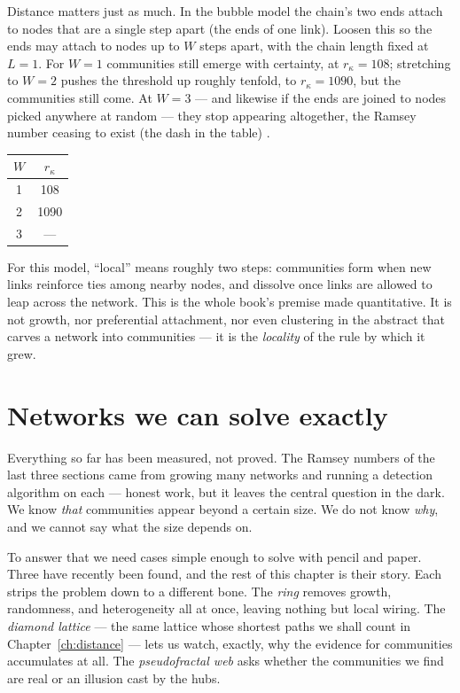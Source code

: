 Distance matters just as much. In the bubble model the chain's two ends attach to
nodes that are a single step apart (the ends of one link). Loosen this so the
ends may attach to nodes up to $W$ steps apart, with the chain length fixed at
$L=1$. For $W=1$ communities still emerge with certainty, at $r_\kappa=108$;
stretching to $W=2$ pushes the threshold up roughly tenfold, to $r_\kappa=1090$,
but the communities still come. At $W=3$ --- and likewise if the ends are joined
to nodes picked anywhere at random --- they stop appearing altogether, the Ramsey
number ceasing to exist (the dash in the table) \citep{vazquezcommunities2025}.

\begin{center}
\begin{tabular}{cc}
\hline
$W$ & $r_\kappa$ \\
\hline
1 & 108 \\
2 & 1090 \\
3 & --- \\
\hline
\end{tabular}
\end{center}

For this model, ``local'' means roughly two steps: communities form
when new links reinforce ties among nearby nodes, and dissolve once links are
allowed to leap across the network. This is the whole book's premise made
quantitative. It is not growth, nor preferential attachment, nor even clustering
in the abstract that carves a network into communities --- it is the
\emph{locality} of the rule by which it grew.

\section{Networks we can solve exactly}

Everything so far has been measured, not proved. The Ramsey numbers of the last
three sections came from growing many networks and running a detection algorithm
on each --- honest work, but it leaves the central question in the dark. We know
\emph{that} communities appear beyond a certain size. We do not know \emph{why},
and we cannot say what the size depends on.

To answer that we need cases simple enough to solve with pencil and paper. Three
have recently been found, and the rest of this chapter is their story. Each strips
the problem down to a different bone. The \emph{ring} \citep{vazquezring2026}
removes growth, randomness, and heterogeneity all at once, leaving nothing but
local wiring. The \emph{diamond lattice} \citep{vazquezrg2026} --- the same
lattice whose shortest paths we shall count in Chapter~\ref{ch:distance} --- lets
us watch, exactly, why the evidence for communities accumulates at all. The
\emph{pseudofractal web} \citep{vazquezpseudofractal2026} asks whether the
communities we find are real or an illusion cast by the hubs.


